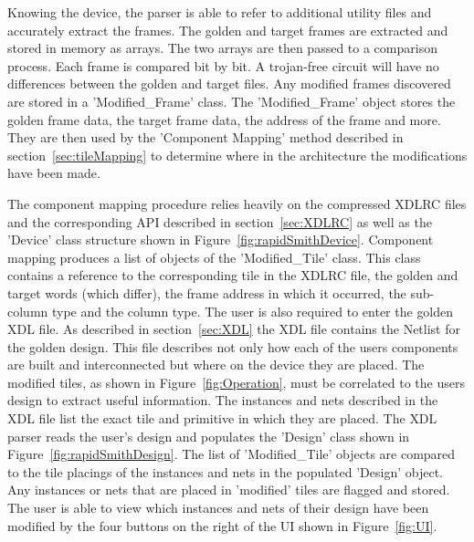 Knowing the device, the parser is able to refer to additional utility files and accurately extract the frames.
The \gls{golden} and \gls{target} frames are extracted and stored in memory as arrays.
The two arrays are then passed to a comparison process.
Each frame is compared bit by bit.
A trojan-free circuit will have no differences between the \gls{golden} and \gls{target} files.
Any modified frames discovered are stored in a 'Modified\_Frame' class.
The 'Modified\_Frame' object stores the \gls{golden} frame data, the \gls{target} frame data, the address of the frame and more.
They are then used by the 'Component Mapping' method described in section~\ref{sec:tileMapping} to determine where in the architecture the modifications have been made.

The component mapping procedure relies heavily on the compressed XDLRC files and the corresponding \acrshort{API} described in section~\ref{sec:XDLRC} as well as the 'Device' class structure shown in Figure~\ref{fig:rapidSmithDevice}.
Component mapping produces a list of objects of the 'Modified\_Tile' class.
This class contains a reference to the corresponding tile in the XDLRC file, the \gls{golden} and \gls{target} words (which differ), the frame address in which it occurred, the sub-column type and the column type.
The user is also required to enter the \gls{golden} \acrshort{XDL} file.
As described in section~\ref{sec:XDL} the \acrshort{XDL} file contains the Netlist for the \gls{golden} design.
This file describes not only how each of the users components are built and interconnected but where on the device they are placed.
The modified tiles, as shown in Figure~\ref{fig:Operation}, must be correlated to the users design to extract useful information.
The instances and nets described in the \acrshort{XDL} file list the exact tile and primitive in which they are placed.
The \RapidSmith \acrshort{XDL} parser reads the user's design and populates the 'Design' class shown in Figure~\ref{fig:rapidSmithDesign}.
The list of 'Modified\_Tile' objects are compared to the tile placings of the instances and nets in the populated 'Design' object.
Any instances or nets that are placed in 'modified' tiles are flagged and stored.
The user is able to view which instances and nets of their design have been modified by the four buttons on the right of the \acrshort{UI} shown in Figure~\ref{fig:UI}.

